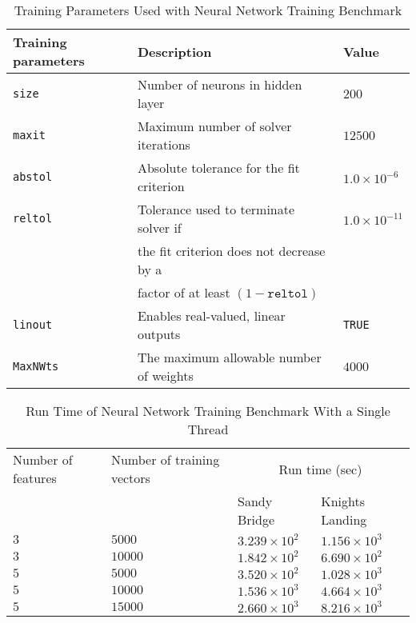 \begin{table*}
  \caption{Training Parameters Used with Neural Network Training Benchmark}
  \label{tab:nnetParams}
  \begin{tabular}{lll}
    \toprule
    Training parameters & Description & Value\\
    \midrule
      \texttt{size}     & Number of neurons in hidden layer        & $200$ \\
      \texttt{maxit}    & Maximum number of solver iterations      & $12500$ \\
      \texttt{abstol}   & Absolute tolerance for the fit criterion & $1.0\times 10^{-6}$\\
      \texttt{reltol}   & Tolerance used to terminate solver if    & $1.0\times 10^{-11}$\\
                        & the fit criterion does not decrease by a &\\
                        & factor of at least $(1-\mathrm{\texttt{reltol}})$ &\\
      \texttt{linout}   & Enables real-valued, linear outputs      & \texttt{TRUE}\\
      \texttt{MaxNWts}  & The maximum allowable number of weights  & $4000$\\ 
    \bottomrule
  \end{tabular}
\end{table*}

\begin{table*}
  \caption{Run Time of Neural Network Training Benchmark With a Single Thread}
  \label{tab:nnetResults}
  \begin{tabular}{llll}
    \toprule
      Number of features & Number of training vectors & \multicolumn{2}{c}{Run time (sec)}\\
                         &                            & Sandy Bridge & Knights Landing\\
    \midrule
    $3$ & $5000$  & $3.239\times 10^{2}$ & $1.156\times 10^{3}$ \\
    $3$ & $10000$ & $1.842\times 10^{2}$ & $6.690\times 10^{2}$ \\
    $5$ & $5000$  & $3.520\times 10^{2}$ & $1.028\times 10^{3}$ \\
    $5$ & $10000$ & $1.536\times 10^{3}$ & $4.664\times 10^{3}$ \\
    $5$ & $15000$ & $2.660\times 10^{3}$ & $8.216\times 10^{3}$ \\
    \bottomrule
  \end{tabular}
\end{table*}

